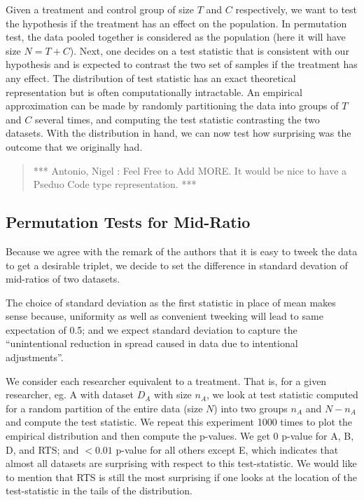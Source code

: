 \documentclass{article}
\begin{document}
Given a treatment and control group of size \(T\) and \(C\)
respectively, we want to test the hypothesis if the treatment has an
effect on the population. In permutation test, the data pooled together
is considered as the population (here it will have size \(N = T+C\)).
Next, one decides on a test statistic that is consistent with our
hypothesis and is expected to contrast the two set of samples if the
treatment has any effect. The distribution of test statistic has an
exact theoretical representation but is often computationally
intractable. An empirical approximation can be made by randomly
partitioning the data into groups of \(T\) and \(C\) several times, and
computing the test statistic contrasting the two datasets. With the
distribution in hand, we can now test how surprising was the outcome
that we originally had.

\begin{quote}
*** Antonio, Nigel : Feel Free to Add MORE. It would be nice to have a
Pseduo Code type representation. ***
\end{quote}

    \subsection{Permutation Tests for
Mid-Ratio}\label{permutation-tests-for-mid-ratio}

Because we agree with the remark of the authors that it is easy to tweek
the data to get a desirable triplet, we decide to set the difference in
standard devation of mid-ratios of two datasets.

The choice of standard deviation as the first statistic in place of mean
makes sense because, uniformity as well as convenient tweeking will lead
to same expectation of 0.5; and we expect standard deviation to capture
the ``unintentional reduction in spread caused in data due to
intentional adjustments''.

We consider each researcher equivalent to a treatment. That is, for a
given researcher, eg. A with dataset \(D_A\) with size \(n_A\), we look
at test statistic computed for a random partition of the entire data
(size \(N\)) into two groups \(n_A\) and \(N-n_A\) and compute the test
statistic. We repeat this experiment 1000 times to plot the empirical
distribution and then compute the p-values. We get 0 p-value for A, B,
D, and RTS; and \(<0.01\) p-value for all others except E, which
indicates that almost all datasets are surprising with respect to this
test-statistic. We would like to mention that RTS is still the most
surprising if one looks at the location of the test-statistic in the
tails of the distribution.
\end{document}
